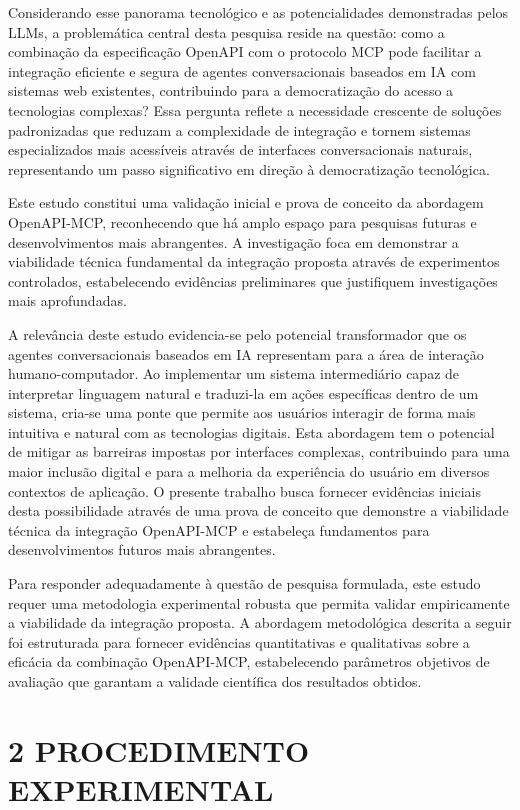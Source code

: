 \documentclass[
]{article}
\begin{document}
Considerando esse panorama tecnológico e as potencialidades demonstradas
pelos LLMs, a problemática central desta pesquisa reside na questão:
como a combinação da especificação OpenAPI com o protocolo MCP pode
facilitar a integração eficiente e segura de agentes conversacionais
baseados em IA com sistemas web existentes, contribuindo para a
democratização do acesso a tecnologias complexas? Essa pergunta reflete
a necessidade crescente de soluções padronizadas que reduzam a
complexidade de integração e tornem sistemas especializados mais
acessíveis através de interfaces conversacionais naturais, representando
um passo significativo em direção à democratização tecnológica.

Este estudo constitui uma validação inicial e prova de conceito da
abordagem OpenAPI-MCP, reconhecendo que há amplo espaço para pesquisas
futuras e desenvolvimentos mais abrangentes. A investigação foca em
demonstrar a viabilidade técnica fundamental da integração proposta
através de experimentos controlados, estabelecendo evidências
preliminares que justifiquem investigações mais aprofundadas.

A relevância deste estudo evidencia-se pelo potencial transformador que
os agentes conversacionais baseados em IA representam para a área de
interação humano-computador. Ao implementar um sistema intermediário
capaz de interpretar linguagem natural e traduzi-la em ações específicas
dentro de um sistema, cria-se uma ponte que permite aos usuários
interagir de forma mais intuitiva e natural com as tecnologias digitais.
Esta abordagem tem o potencial de mitigar as barreiras impostas por
interfaces complexas, contribuindo para uma maior inclusão digital e
para a melhoria da experiência do usuário em diversos contextos de
aplicação. O presente trabalho busca fornecer evidências iniciais desta
possibilidade através de uma prova de conceito que demonstre a
viabilidade técnica da integração OpenAPI-MCP e estabeleça fundamentos
para desenvolvimentos futuros mais abrangentes.

Para responder adequadamente à questão de pesquisa formulada, este
estudo requer uma metodologia experimental robusta que permita validar
empiricamente a viabilidade da integração proposta. A abordagem
metodológica descrita a seguir foi estruturada para fornecer evidências
quantitativas e qualitativas sobre a eficácia da combinação OpenAPI-MCP,
estabelecendo parâmetros objetivos de avaliação que garantam a validade
científica dos resultados obtidos.

\section{2 PROCEDIMENTO EXPERIMENTAL}\label{procedimento-experimental}
\end{document}
